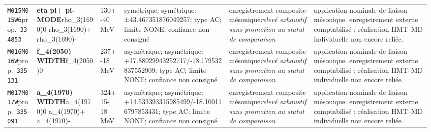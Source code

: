 \begin{landscape}
\begin{longtable}{L{1.85cm}L{4.45cm}L{2.35cm}L{4.05cm}L{3.35cm}L{7.15cm}}
\texttt{M015}\newline \texttt{M015W6}\newline prop.\ \texttt{334853} & \textbf{eta pi+ pi- MODE}\newline rho\_\allowbreak{}3(1690)0 \textbar{}\allowbreak{} rho\_\allowbreak{}3(1690)+ \textbar{}\allowbreak{} rho\_\allowbreak{}3(1690)- & 130+-40\,MeV & symétrique; symétrique: ±43.467351876049257; type AC; limite NONE; confiance non consigné & enregistrement composite mésonique\newline \emph{relevé exhaustif sans promotion au statut de comparaison} & application nominale de liaison mésonique. enregistrement externe comptabilisé ; réalisation HMT--MD individuelle non encore reliée. \\
\texttt{M016}\newline \texttt{M016W}\newline prop.\ \texttt{335131} & \textbf{f\_\allowbreak{}4(2050) WIDTH}\newline f\_\allowbreak{}4(2050)0 & 237+-18\,MeV & asymétrique; asymétrique: +17.88029943252717/-18.179532837552909; type AC; limite NONE; confiance non consigné & enregistrement composite mésonique\newline \emph{relevé exhaustif sans promotion au statut de comparaison} & application nominale de liaison mésonique. enregistrement externe comptabilisé ; réalisation HMT--MD individuelle non encore reliée. \\
\texttt{M017}\newline \texttt{M017W}\newline prop.\ \texttt{335091} & \textbf{a\_\allowbreak{}4(1970) WIDTH}\newline a\_\allowbreak{}4(1970)0 \textbar{}\allowbreak{} a\_\allowbreak{}4(1970)+ \textbar{}\allowbreak{} a\_\allowbreak{}4(1970)- & 324+15-18\,MeV & asymétrique; asymétrique: +14.533393315985499/-18.100116797853431; type AC; limite NONE; confiance non consigné & enregistrement composite mésonique\newline \emph{relevé exhaustif sans promotion au statut de comparaison} & application nominale de liaison mésonique. enregistrement externe comptabilisé ; réalisation HMT--MD individuelle non encore reliée. \\

\end{longtable}
\end{landscape}
